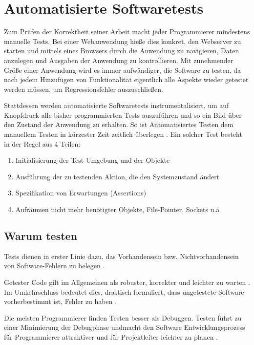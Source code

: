 \section{Automatisierte Softwaretests}

Zum Prüfen der Korrektheit seiner Arbeit macht jeder Programmierer mindestens manuelle Tests. Bei einer Webanwendung hieße dies konkret, den Webserver zu starten und mittels eines Browsers durch die Anwendung zu navigieren, Daten anzulegen und Ausgaben der Anwendung zu kontrollieren. Mit zunehmender Größe einer Anwendung wird es immer aufwändiger, die Software zu testen, da nach jedem Hinzufügen von Funktionalität eigentlich alle Aspekte wieder getestet werden müssen, um Regressionsfehler auszuschließen.

Stattdessen werden automatisierte Softwaretests instrumentalisiert, um auf Knopfdruck alle bisher programmierten Tests auszuführen und so ein Bild über den Zustand der Anwendung zu erhalten. So ist Automatisiertes Testen dem manuellem Testen in kürzester Zeit zeitlich überlegen \citep{rappin_rails_2011}.
Ein solcher Test besteht in der Regel aus 4 Teilen:
\begin{enumerate}
 \item Initialisierung der Test-Umgebung und der Objekte
 \item Ausführung der zu testenden Aktion, die den Systemzustand ändert
 \item Spezifikation von Erwartungen (Assertions)
 \item Aufräumen nicht mehr benötigter Objekte, File-Pointer, Sockets u.ä 
\end{enumerate}



\subsection{Warum testen}
Tests dienen in erster Linie dazu, das Vorhandensein bzw. Nichtvorhandensein von Software-Fehlern zu belegen \citep{goodliffe_code_2006}.

Getester Code gilt im Allgemeinen als robuster, korrekter und leichter zu warten \citep{rappin_rails_2011}. Im Umkehrschluss bedeutet dies, drastisch formuliert, dass ungetestete Software vorherbestimmt ist, Fehler zu haben \citep{goodliffe_code_2006}.

Die meisten Programmierer finden Testen besser als Debuggen. Testen führt zu einer Minimierung der Debugphase undmacht den Software Entwicklungsprozess für Programmierer attraktiver und für Projektleiter leichter zu planen \citep{orsini_rails_2007}.


